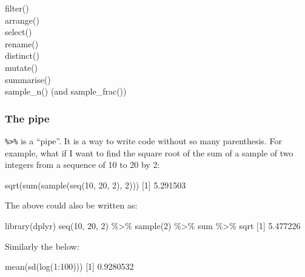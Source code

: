 \documentclass[
]{book}
\newenvironment{Shaded}{\begin{snugshade}}{\end{snugshade}}
\newcommand{\DecValTok}[1]{\textcolor[rgb]{0.00,0.00,0.81}{#1}}
\newcommand{\FloatTok}[1]{\textcolor[rgb]{0.00,0.00,0.81}{#1}}
\newcommand{\FunctionTok}[1]{\textcolor[rgb]{0.00,0.00,0.00}{#1}}
\newcommand{\NormalTok}[1]{#1}
\newcommand{\SpecialCharTok}[1]{\textcolor[rgb]{0.00,0.00,0.00}{#1}}
\begin{document}
filter()\\
arrange()\\
select()\\
rename()\\
distinct()\\
mutate()\\
summarise()\\
sample\_n() (and sample\_frac())

\hypertarget{the-pipe}{%
\subsubsection{The pipe}\label{the-pipe}}

\texttt{\%\textgreater{}\%} is a ``pipe''. It is a way to write code without so many parenthesis. For example, what if I want to find the square root of the sum of a sample of two integers from a sequence of 10 to 20 by 2:

\begin{Shaded}
\begin{Highlighting}[]
\FunctionTok{sqrt}\NormalTok{(}\FunctionTok{sum}\NormalTok{(}\FunctionTok{sample}\NormalTok{(}\FunctionTok{seq}\NormalTok{(}\DecValTok{10}\NormalTok{, }\DecValTok{20}\NormalTok{, }\DecValTok{2}\NormalTok{), }\DecValTok{2}\NormalTok{)))}
\NormalTok{[}\DecValTok{1}\NormalTok{] }\FloatTok{5.291503}
\end{Highlighting}
\end{Shaded}

The above could also be written as:

\begin{Shaded}
\begin{Highlighting}[]
\FunctionTok{library}\NormalTok{(dplyr)}
\FunctionTok{seq}\NormalTok{(}\DecValTok{10}\NormalTok{, }\DecValTok{20}\NormalTok{, }\DecValTok{2}\NormalTok{) }\SpecialCharTok{\%\textgreater{}\%} \FunctionTok{sample}\NormalTok{(}\DecValTok{2}\NormalTok{) }\SpecialCharTok{\%\textgreater{}\%}\NormalTok{ sum }\SpecialCharTok{\%\textgreater{}\%}\NormalTok{ sqrt}
\NormalTok{[}\DecValTok{1}\NormalTok{] }\FloatTok{5.477226}
\end{Highlighting}
\end{Shaded}

Similarly the below:

\begin{Shaded}
\begin{Highlighting}[]
\FunctionTok{mean}\NormalTok{(}\FunctionTok{sd}\NormalTok{(}\FunctionTok{log}\NormalTok{(}\DecValTok{1}\SpecialCharTok{:}\DecValTok{100}\NormalTok{)))}
\NormalTok{[}\DecValTok{1}\NormalTok{] }\FloatTok{0.9280532}
\end{Highlighting}
\end{Shaded}
\end{document}
